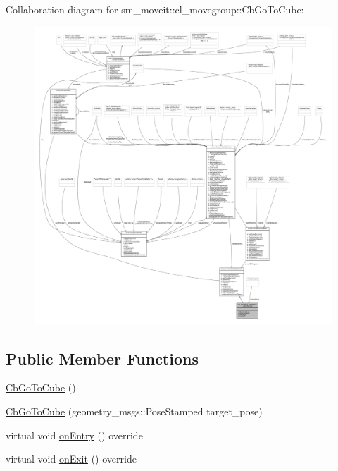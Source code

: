 Collaboration diagram for sm\+\_\+moveit\+:\+:cl\+\_\+movegroup\+:\+:Cb\+Go\+To\+Cube\+:
\nopagebreak
\begin{figure}[H]
\begin{center}
\leavevmode
\includegraphics[width=350pt]{classsm__moveit_1_1cl__movegroup_1_1CbGoToCube__coll__graph}
\end{center}
\end{figure}
\subsection*{Public Member Functions}
\begin{DoxyCompactItemize}
\item 
\hyperlink{classsm__moveit_1_1cl__movegroup_1_1CbGoToCube_aca49e48c61324ded9e854e8009b5eeaa}{Cb\+Go\+To\+Cube} ()
\item 
\hyperlink{classsm__moveit_1_1cl__movegroup_1_1CbGoToCube_a14c015e64f3b1c5a6c2826d8f18ab2e0}{Cb\+Go\+To\+Cube} (geometry\+\_\+msgs\+::\+Pose\+Stamped target\+\_\+pose)
\item 
virtual void \hyperlink{classsm__moveit_1_1cl__movegroup_1_1CbGoToCube_a99528dd31662495dc5174117d06c0310}{on\+Entry} () override
\item 
virtual void \hyperlink{classsm__moveit_1_1cl__movegroup_1_1CbGoToCube_a6107cf3da410921921132d9225da58e6}{on\+Exit} () override
\end{DoxyCompactItemize}
